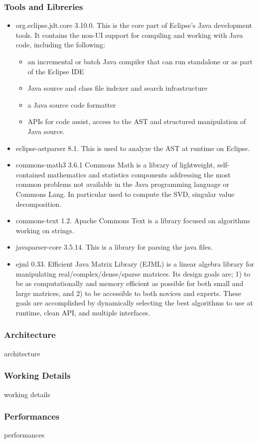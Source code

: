 \subsubsection{Tools and Libreries}
\begin{itemize}
\item org.eclipse.jdt.core 3.10.0. 
This is the core part of Eclipse's Java development tools. It contains the non-UI support for compiling and working with Java code, including the following:
	\begin{itemize}
	\item an incremental or batch Java compiler that can run standalone or as part of the Eclipse IDE
	\item Java source and class file indexer and search infrastructure
	\item a Java source code formatter
	\item APIs for code assist, access to the AST and structured manipulation of Java source.
	\end{itemize}
\item eclipse-astparser 8.1. This is used to analyze the AST at runtime on Eclipse.
\item commons-math3 3.6.1 Commons Math is a library of lightweight, self-contained mathematics and statistics components addressing the most common problems not available in the Java programming language or Commons Lang. 
In particular used to compute the SVD, singular value decomposition.
\item commons-text 1.2. Apache Commons Text is a library focused on algorithms working on strings. 
\item javaparser-core 3.5.14. This is a library for parsing the java files.
\item ejml 0.33. Efficient Java Matrix Library (EJML) is a linear algebra library for manipulating real/complex/dense/sparse matrices. Its design goals are; 1) to be as computationally and memory efficient as possible for both small and large matrices, and 2) to be accessible to both novices and experts. These goals are accomplished by dynamically selecting the best algorithms to use at runtime, clean API, and multiple interfaces.
\end{itemize}



\subsubsection{Architecture}

architecture

\subsubsection{Working Details}

working details

\subsubsection{Performances}

performances

